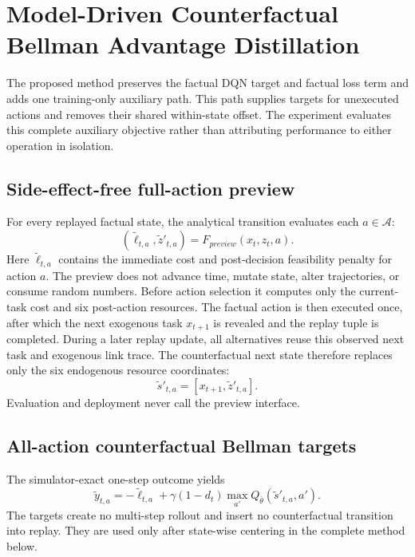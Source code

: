 \documentclass[11pt]{article}
\begin{document}
\section{Model-Driven Counterfactual Bellman Advantage Distillation}
\label{sec:method}

The proposed method preserves the factual DQN target and factual loss term and adds one training-only auxiliary path. This path supplies targets for unexecuted actions and removes their shared within-state offset. The experiment evaluates this complete auxiliary objective rather than attributing performance to either operation in isolation.

\subsection{Side-effect-free full-action preview}

For every replayed factual state, the analytical transition evaluates each $a\in\mathcal A$:
\begin{equation}
(\tilde \ell_{t,a},\tilde z'_{t,a})=F_{preview}(x_t,z_t,a).
\end{equation}
{\color{red}%
Here $\tilde \ell_{t,a}$ contains the immediate cost and post-decision feasibility penalty for action $a$. The preview does not advance time, mutate state, alter trajectories, or consume random numbers. Before action selection it computes only the current-task cost and six post-action resources. The factual action is then executed once, after which the next exogenous task $x_{t+1}$ is revealed and the replay tuple is completed. During a later replay update, all alternatives reuse this observed next task and exogenous link trace. The counterfactual next state therefore replaces only the six endogenous resource coordinates:
}%
\begin{equation}
\tilde s'_{t,a}=[x_{t+1},\tilde z'_{t,a}].
\end{equation}
Evaluation and deployment never call the preview interface.

\subsection{All-action counterfactual Bellman targets}

The simulator-exact one-step outcome yields
\begin{equation}
\tilde y_{t,a}=-\tilde \ell_{t,a}+\gamma(1-d_t)
\max_{a'}Q_{\bar\theta}(\tilde s'_{t,a},a').
\label{eq:cf_target}
\end{equation}
The targets create no multi-step rollout and insert no counterfactual transition into replay. They are used only after state-wise centering in the complete method below.
\end{document}
